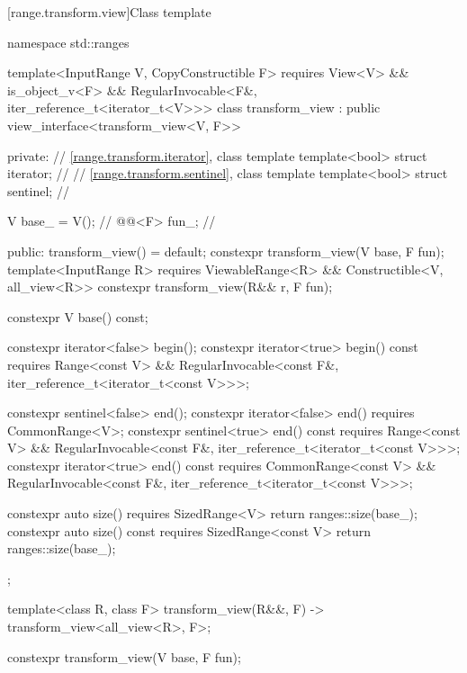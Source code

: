[range.transform.view]{Class template }

\begin{codeblock}
namespace std::ranges {
  template<InputRange V, CopyConstructible F>
    requires View<V> && is_object_v<F> &&
             RegularInvocable<F&, iter_reference_t<iterator_t<V>>>
  class transform_view : public view_interface<transform_view<V, F>> {
  private:
    // \ref{range.transform.iterator}, class template 
    template<bool> struct iterator;             // \expos
    // \ref{range.transform.sentinel}, class template 
    template<bool> struct sentinel;             // \expos

    V base_ = V();                              // \expos
    @@<F> fun_;                        // \expos

  public:
    transform_view() = default;
    constexpr transform_view(V base, F fun);
    template<InputRange R>
      requires ViewableRange<R> && Constructible<V, all_view<R>>
    constexpr transform_view(R&& r, F fun);

    constexpr V base() const;

    constexpr iterator<false> begin();
    constexpr iterator<true> begin() const
      requires Range<const V> &&
               RegularInvocable<const F&, iter_reference_t<iterator_t<const V>>>;

    constexpr sentinel<false> end();
    constexpr iterator<false> end() requires CommonRange<V>;
    constexpr sentinel<true> end() const
      requires Range<const V> &&
               RegularInvocable<const F&, iter_reference_t<iterator_t<const V>>>;
    constexpr iterator<true> end() const
      requires CommonRange<const V> &&
               RegularInvocable<const F&, iter_reference_t<iterator_t<const V>>>;

    constexpr auto size() requires SizedRange<V> { return ranges::size(base_); }
    constexpr auto size() const requires SizedRange<const V>
    { return ranges::size(base_); }
  };

  template<class R, class F>
    transform_view(R&&, F) -> transform_view<all_view<R>, F>;
}
\end{codeblock}

%
\begin{itemdecl}
constexpr transform_view(V base, F fun);
\end{itemdecl}

